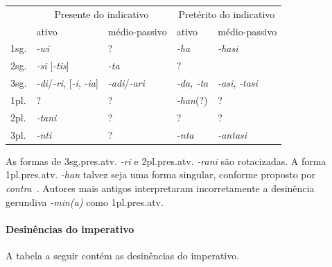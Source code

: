 \begin{center}
	\begin{tabular}[c]{lll|ll}
		\toprule
		     & \multicolumn{2}{c|}{Presente do indicativo}           & \multicolumn{2}{c}{Pretérito do indicativo}                                                \\
		     & ativo                                                 & médio-passivo                               & ativo            & médio-passivo             \\
		\midrule
		1sg. & \emph{-wi}                                            & {?}                                         & \emph{-ha}       & \emph{-hasi}              \\
		2sg. & \emph{-si} [\emph{-tis}]                              & \emph{-ta}                                  & {?}              &                           \\
		3sg. & \emph{-di}\slash{}\emph{-ri}, [\emph{-i}, \emph{-ia}] & \emph{-adi}\slash{}\emph{-ari}              & \emph{-da, -ta}  & \emph{-asi}, \emph{-tasi} \\
		1pl. & {?}                                                   & {?}                                         & \emph{-han}{(?)} & {?}                       \\
		2pl. & \emph{-tani}                                          & {?}                                         & {?}              & {?}                       \\
		3pl. & \emph{-nti}                                           & {?}                                         & \emph{-nta}      & \emph{-antasi}            \\
		\bottomrule
	\end{tabular}
\end{center}

\noindent As formas de 3sg.pres.atv. \emph{-ri} e 2pl.pres.atv. \emph{-rani} são
rotacizadas. A forma 1pl.pres.atv. \emph{-han} talvez seja uma forma singular,
conforme proposto por~\citet{Carruba1984} \emph{contra}~\citet{MorpurgoDavies1980}.
Autores mais antigos interpretaram incorretamente a desinência
gerundiva \emph{-min{(a)}} como 1pl.pres.atv.

\paragraph{Desinências do imperativo}
A tabela a seguir contém as desinências do imperativo.

